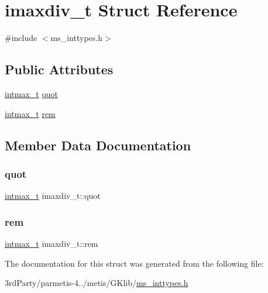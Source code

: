 \hypertarget{structimaxdiv__t}{}\section{imaxdiv\+\_\+t Struct Reference}
\label{structimaxdiv__t}


{\ttfamily \#include $<$ms\+\_\+inttypes.\+h$>$}

\subsection*{Public Attributes}
\begin{DoxyCompactItemize}
\item 
\hyperlink{ms__stdint_8h_a036cd61bb4b30bb510b9538af4cebd1d}{intmax\+\_\+t} \hyperlink{structimaxdiv__t_a9339814cbb7610c72fb7d30c6573b393}{quot}
\item 
\hyperlink{ms__stdint_8h_a036cd61bb4b30bb510b9538af4cebd1d}{intmax\+\_\+t} \hyperlink{structimaxdiv__t_a6c9701ad10bff81edae7ff679cae7850}{rem}
\end{DoxyCompactItemize}


\subsection{Member Data Documentation}
\mbox{\label{structimaxdiv__t_a9339814cbb7610c72fb7d30c6573b393}} 
\subsubsection{\texorpdfstring{quot}{quot}}
{\footnotesize\ttfamily \hyperlink{ms__stdint_8h_a036cd61bb4b30bb510b9538af4cebd1d}{intmax\+\_\+t} imaxdiv\+\_\+t\+::quot}

\mbox{\label{structimaxdiv__t_a6c9701ad10bff81edae7ff679cae7850}} 
\subsubsection{\texorpdfstring{rem}{rem}}
{\footnotesize\ttfamily \hyperlink{ms__stdint_8h_a036cd61bb4b30bb510b9538af4cebd1d}{intmax\+\_\+t} imaxdiv\+\_\+t\+::rem}



The documentation for this struct was generated from the following file\+:\begin{DoxyCompactItemize}
\item 
3rd\+Party/parmetis-\/4../metis/\+G\+Klib/\hyperlink{ms__inttypes_8h}{ms\+\_\+inttypes.\+h}\end{DoxyCompactItemize}
